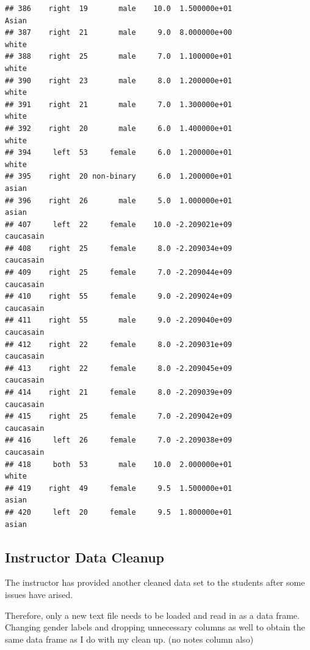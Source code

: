 \documentclass[]{article}
\begin{document}
\begin{verbatim}
## 386    right  19       male    10.0  1.500000e+01              Asian
## 387    right  21       male     9.0  8.000000e+00              white
## 388    right  25       male     7.0  1.100000e+01              white
## 390    right  23       male     8.0  1.200000e+01              white
## 391    right  21       male     7.0  1.300000e+01              white
## 392    right  20       male     6.0  1.400000e+01              white
## 394     left  53     female     6.0  1.200000e+01              white
## 395    right  20 non-binary     6.0  1.200000e+01              asian
## 396    right  26       male     5.0  1.000000e+01              asian
## 407     left  22     female    10.0 -2.209021e+09          caucasain
## 408    right  25     female     8.0 -2.209034e+09          caucasain
## 409    right  25     female     7.0 -2.209044e+09          caucasain
## 410    right  55     female     9.0 -2.209024e+09          caucasain
## 411    right  55       male     9.0 -2.209040e+09          caucasain
## 412    right  22     female     8.0 -2.209031e+09          caucasain
## 413    right  22     female     8.0 -2.209045e+09          caucasain
## 414    right  21     female     8.0 -2.209039e+09          caucasain
## 415    right  25     female     7.0 -2.209042e+09          caucasain
## 416     left  26     female     7.0 -2.209038e+09          caucasain
## 418     both  53       male    10.0  2.000000e+01              white
## 419    right  49     female     9.5  1.500000e+01              asian
## 420     left  20     female     9.5  1.800000e+01              asian
\end{verbatim}

\newpage

\subsection{Instructor Data Cleanup}
\label{sec:appendix-instructor-data-cleanup}

The instructor has provided another cleaned data set to the students
after some issues have arised.

Therefore, only a new text file needs to be loaded and read in as a data
frame. Changing gender labels and dropping unnecessary columns as well
to obtain the same data frame as I do with my clean up. (no notes column
also)
\end{document}
